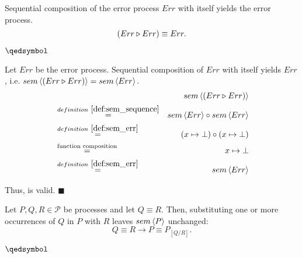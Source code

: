 \begin{theorem}
\label{thm:idempotence_err}
Sequential composition of the error process $Err$ with itself yields the error process.
\begin{equation*}
  \left( Err \triangleright Err \right) \equiv Err.
\end{equation*}

\hfill$\qedsymbol$
\end{theorem}

\begin{myproof}
Let $Err$ be the error process. Sequential composition of $Err$ with itself yields $Err$, i.e. $sem \left\langle \left( Err \triangleright Err \right) \right\rangle = sem \left\langle Err \right\rangle$.
\begin{eqnarray*}
  & & \sem{\sequence{Err}{Err}} \\
    & \overset{\defref{def:sem_sequence}}{=} & \sem{Err} \circ \sem{Err} \\
    & \overset{\defref{def:sem_err}}{=} & \left( x \mapsto \bot \right) \circ \left( x \mapsto \bot \right) \\
    & \overset{\text{function composition}}{=} & x \mapsto \bot \\
    & \overset{\defref{def:sem_err}}{=} & \sem{Err}
\end{eqnarray*}

Thus,  is valid. \hfill$\blacksquare$
\end{myproof}



\begin{theorem}
\label{thm:substitution_equivalence}
Let $P, Q, R \in \mathcal{P}$ be processes and let $Q \equiv R$. Then, substituting one or more occurrences of $Q$ in $P$ with $R$ leaves $sem \left\langle P \right\rangle$ unchanged:
  \begin{equation*}
    Q \equiv R \rightarrow P \equiv P_{\left[ Q / R \right]}.
  \end{equation*}
  
  \hfill$\qedsymbol$
\end{theorem}

